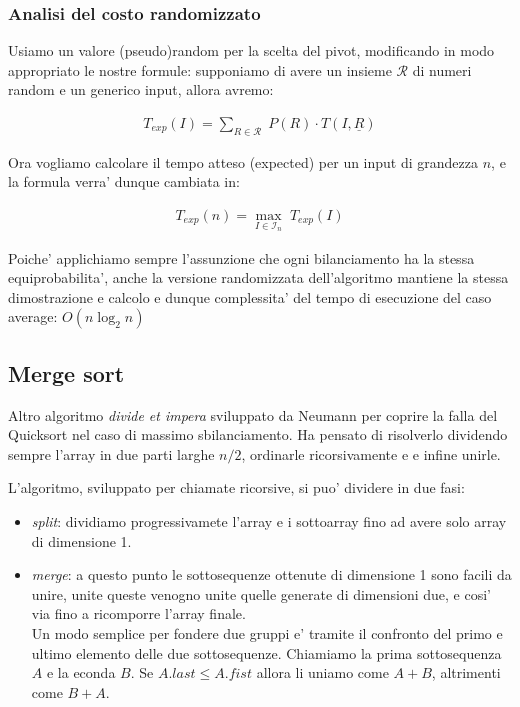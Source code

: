 \documentclass{article}
\begin{document}

\subsubsection{Analisi del costo randomizzato}

Usiamo un valore (pseudo)random per la scelta del pivot, modificando in modo
appropriato le nostre formule: supponiamo di avere un insieme $\mathcal{R}$ di
numeri random e un generico input, allora avremo:

\begin{align*}
  T_{exp}(I) = \sum_{R \in \mathcal{R}} \; P(R) \cdot T(I, \underline{R})
\end{align*}

Ora vogliamo calcolare il tempo atteso (expected) per un input di grandezza $n$,
e la formula verra' dunque cambiata in:

\begin{align*}
  T_{exp}(n) = \max_{I \in \mathcal{I}_n} \; T_{exp}(I)
\end{align*}

Poiche' applichiamo sempre l'assunzione che ogni bilanciamento ha la stessa
equiprobabilita', anche la versione randomizzata dell'algoritmo mantiene la stessa
dimostrazione e calcolo e dunque complessita' del tempo di esecuzione del caso average:
$O(n \log_2 n)$

\subsection{Merge sort}

Altro algoritmo \emph{divide et impera} sviluppato da Neumann per coprire la
falla del Quicksort nel caso di massimo sbilanciamento. Ha pensato di risolverlo
dividendo sempre l'array in due parti larghe $n/2$, ordinarle ricorsivamente e
e infine unirle.

L'algoritmo, sviluppato per chiamate ricorsive, si puo' dividere in due fasi:
\begin{itemize}
  \item \emph{split}: dividiamo progressivamete l'array e i sottoarray fino ad avere
    solo array di dimensione 1.
  \item \emph{merge}: a questo punto le sottosequenze ottenute di dimensione 1
    sono facili da unire, unite queste venogno unite quelle generate di dimensioni
    due, e cosi' via fino a ricomporre l'array finale. \\
    Un modo semplice per fondere due gruppi e' tramite il confronto del primo e
    ultimo elemento delle due sottosequenze. Chiamiamo la prima sottosequenza $A$
    e la econda $B$. Se $A.last \leq A.fist$ allora li uniamo come $A + B$, altrimenti come $B + A$.
\end{itemize}
\end{document}
